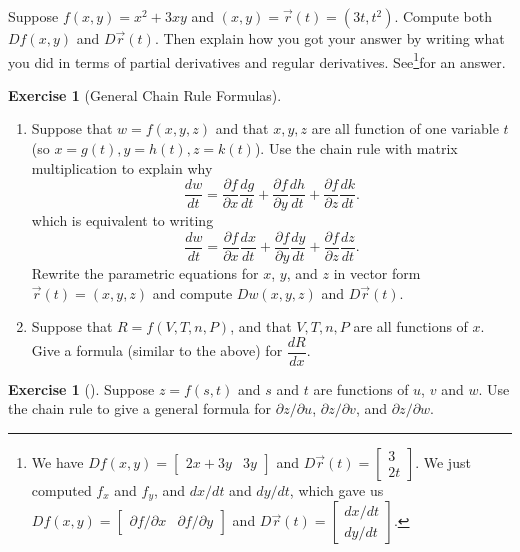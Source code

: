 \documentclass[10pt,]{book}
\theoremstyle{plain}
\theoremstyle{definition}
\theoremstyle{definition}
\theoremstyle{definition}
\theoremstyle{definition}
\newtheorem{exploration}[project]{Exercise}
\theoremstyle{definition}
\numberwithin{equation}{section}
\newcommand{\amp}{&}
\begin{document}
Suppose \(f(x,y)=x^2+3xy\) and \((x,y) = \vec r(t) = (3t,t^2)\). Compute both \(Df(x,y)\) and \(D\vec r(t)\). Then explain how you got your answer by writing what you did in terms of partial derivatives and regular derivatives. See\footnote{We have \(Df(x,y) = \begin{bmatrix}2x+3y\amp 3y
\end{bmatrix}\) and \(D\vec r(t) = \begin{bmatrix}3\\2t
\end{bmatrix}\). We just computed \(f_x\) and \(f_y\), and \(dx/dt\) and \(dy/dt\), which gave us \(Df(x,y) = \begin{bmatrix}\partial f/\partial x\amp \partial f/\partial y
\end{bmatrix}\) and \(D\vec r(t) = \begin{bmatrix}dx/dt\\dy/dt
\end{bmatrix}\).\label{fn-4}}for an answer.%
\begin{exploration}[General Chain Rule Formulas]\label{exploration-156}
\leavevmode%
\begin{enumerate}[font=\bfseries,label=(\alph*),ref=\alph*]
\item\label{task-367} Suppose that \(w=f(x,y,z)\) and that \(x,y,z\) are all function of one variable \(t\) (so \(x=g(t), y=h(t), z=k(t)\)). Use the chain rule with matrix multiplication to explain why%
\begin{equation*}
\frac{dw}{dt} 
= \frac{\partial f}{\partial x}\frac{dg}{dt}+\frac{\partial f}{\partial y}\frac{dh}{dt}+\frac{\partial f}{\partial z}\frac{dk}{dt} 
.
\end{equation*}
which is equivalent to writing%
\begin{equation*}
\frac{dw}{dt} 
= \frac{\partial f}{\partial x}\frac{dx}{dt}+\frac{\partial f}{\partial y}\frac{dy}{dt}+\frac{\partial f}{\partial z}\frac{dz}{dt} 
.
\end{equation*}
Rewrite the parametric equations for \(x\), \(y\), and \(z\) in vector form \(\vec r(t) = (x,y,z)\) and compute \(Dw(x,y,z)\) and \(D\vec r(t)\).%
%
\item\label{task-368} Suppose that \(R=f(V,T,n,P)\), and that \(V,T,n,P\) are all functions of \(x\).  Give a formula (similar to the above) for \(\dfrac{dR}{dx}.\)%
\end{enumerate}
\end{exploration}
\begin{exploration}[]\label{exploration-157}
\larsonfive{ } Suppose \(z=f(s,t)\) and \(s\) and \(t\) are functions of \(u\), \(v\) and \(w\). Use the chain rule to give a general formula for \(\partial z/\partial u\), \(\partial z/\partial v\), and \(\partial z/\partial w\).%
\end{exploration}
\end{document}
